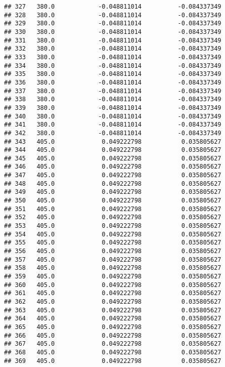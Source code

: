 \documentclass[]{article}
\begin{document}
\begin{verbatim}
## 327   380.0            -0.048811014          -0.084337349
## 328   380.0            -0.048811014          -0.084337349
## 329   380.0            -0.048811014          -0.084337349
## 330   380.0            -0.048811014          -0.084337349
## 331   380.0            -0.048811014          -0.084337349
## 332   380.0            -0.048811014          -0.084337349
## 333   380.0            -0.048811014          -0.084337349
## 334   380.0            -0.048811014          -0.084337349
## 335   380.0            -0.048811014          -0.084337349
## 336   380.0            -0.048811014          -0.084337349
## 337   380.0            -0.048811014          -0.084337349
## 338   380.0            -0.048811014          -0.084337349
## 339   380.0            -0.048811014          -0.084337349
## 340   380.0            -0.048811014          -0.084337349
## 341   380.0            -0.048811014          -0.084337349
## 342   380.0            -0.048811014          -0.084337349
## 343   405.0             0.049222798           0.035805627
## 344   405.0             0.049222798           0.035805627
## 345   405.0             0.049222798           0.035805627
## 346   405.0             0.049222798           0.035805627
## 347   405.0             0.049222798           0.035805627
## 348   405.0             0.049222798           0.035805627
## 349   405.0             0.049222798           0.035805627
## 350   405.0             0.049222798           0.035805627
## 351   405.0             0.049222798           0.035805627
## 352   405.0             0.049222798           0.035805627
## 353   405.0             0.049222798           0.035805627
## 354   405.0             0.049222798           0.035805627
## 355   405.0             0.049222798           0.035805627
## 356   405.0             0.049222798           0.035805627
## 357   405.0             0.049222798           0.035805627
## 358   405.0             0.049222798           0.035805627
## 359   405.0             0.049222798           0.035805627
## 360   405.0             0.049222798           0.035805627
## 361   405.0             0.049222798           0.035805627
## 362   405.0             0.049222798           0.035805627
## 363   405.0             0.049222798           0.035805627
## 364   405.0             0.049222798           0.035805627
## 365   405.0             0.049222798           0.035805627
## 366   405.0             0.049222798           0.035805627
## 367   405.0             0.049222798           0.035805627
## 368   405.0             0.049222798           0.035805627
## 369   405.0             0.049222798           0.035805627

\end{verbatim}
\end{document}
